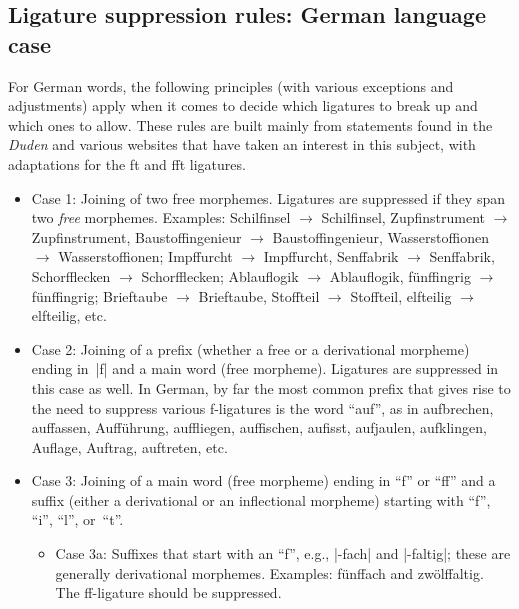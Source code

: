 \documentclass[11pt]{article}
\begin{document}
\subsection{Ligature suppression rules: German language case}

For German words, the following principles (with various exceptions and adjustments) apply when it comes to decide which ligatures to break up and which ones to allow. These rules are built mainly from statements found in the \emph{Duden} and various websites that have taken an interest in this subject, with adaptations for the ft and fft ligatures.
\begin{itemize}
\item Case 1: Joining of two free morphemes. Ligatures are suppressed if they span two \emph{free} morphemes. Examples: Schil\mbox{fi}nsel $\to$ Schilfinsel, Zup\mbox{fi}nstrument $\to$ Zupfinstrument, Bausto\mbox{ffi}ngenieur $\to$ Baustoffingenieur, Wassersto\mbox{ffi}onen $\to$ Wasserstoffionen; Imp\mbox{ff}urcht $\to$ Impffurcht, Sen\mbox{ff}abrik $\to$ Senffabrik, Schor\mbox{ffl}ecken $\to$ Schorfflecken; Ablau\mbox{fl}ogik $\to$ Ablauflogik,  fün\mbox{ffi}ngrig $\to$ fünf\mbox{fi}ngrig; Brie\mbox{ft}aube $\to$ Brieftaube, Sto\mbox{fft}eil $\to$ Stoffteil, el\mbox{ft}eilig $\to$ elfteilig, etc.


\item Case 2: Joining of a prefix (whether a free or a derivational morpheme) ending in~|f| and a main word (free morpheme). Ligatures are suppressed in this case as well. In German, by far the most common prefix that gives rise to the need to suppress various f-ligatures is the word \enquote{auf}, as in aufbrechen, auffassen, Aufführung, auffliegen, auffischen, auf\breaklig iss\breaklig t, aufjaulen, aufklingen, Auflage, Auftrag, auftreten, etc.

\item Case 3: Joining of a main word (free morpheme) ending in \enquote{f} or \enquote{ff} and a suffix (either a derivational or an inflectional morpheme) starting with \enquote{f}, \enquote{i}, \enquote{l}, or~\enquote{t}.

\begin{itemize}
\item Case 3a: Suffixes that start with an \enquote{f}, e.g., |-fach| and |-faltig|; these are generally derivational morphemes. Examples: fünffach and zwölffaltig. The ff-ligature should be suppressed. 


\end{itemize}
\end{itemize}
\end{document}
